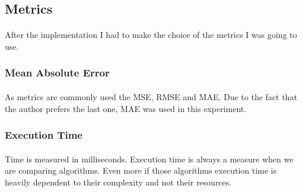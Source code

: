 \subsection{Metrics}
\paragraph{}After the implementation I had to make the choice of the metrics I was going to use.
\subsubsection{Mean Absolute Error}
\paragraph{}As metrics are commonly used the MSE, RMSE and MAE. Due to the fact that the author prefers the last one, MAE was used in this experiment.

\subsubsection{Execution Time}
\paragraph{}Time is measured in milliseconds.
Execution time is always a measure when we are comparing algorithms. 
Even more if those algorithms execution time is heavily dependent to their complexity and not their resources.
